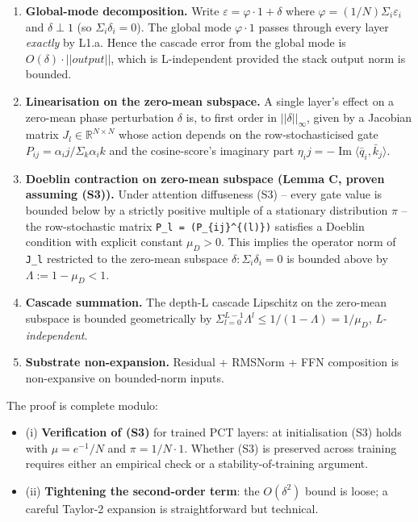 \documentclass[11pt,a4paper]{article}
\theoremstyle{plain}
\theoremstyle{definition}
\renewcommand{\Im}{\operatorname{Im}}
\begin{document}
\begin{enumerate}
  \item \textbf{Global-mode decomposition.} Write $\varepsilon  = \varphi  \cdot  1 + \delta $ where $\varphi  = (1/N) \Sigma _i \varepsilon _i$ and $\delta  \perp  1$ (so $\Sigma _i \delta _i = 0$). The global mode $\varphi  \cdot  1$ passes through every layer \emph{exactly} by L1.a. Hence the cascade error from the global mode is $O(\delta ) \cdot  ||output||$, which is L-independent provided the stack output norm is bounded.
  \item \textbf{Linearisation on the zero-mean subspace.} A single layer's effect on a zero-mean phase perturbation $\delta $ is, to first order in $||\delta ||_\infty $, given by a Jacobian matrix $J_l \in  \mathbb{R}^{N\times N}$ whose action depends on the row-stochasticised gate $P_{ij} = \alpha _ij / \Sigma _k \alpha _ik$ and the cosine-score's imaginary part $\eta _ij = -\Im \langle \bar{q}_i, \bar{k}_j\rangle $.
  \item \textbf{Doeblin contraction on zero-mean subspace (Lemma C, proven assuming (S3)).} Under attention diffuseness (S3) -- every gate value is bounded below by a strictly positive multiple of a stationary distribution $\pi $ -- the row-stochastic matrix \texttt{P\_l = (P\_\{ij\}\^{}\{(l)\})} satisfies a Doeblin condition with explicit constant $\mu _D > 0$. This implies the operator norm of \texttt{J\_l} restricted to the zero-mean subspace ${\delta  : \Sigma _i \delta _i = 0}$ is bounded above by $\Lambda  := 1 - \mu _D < 1$.
  \item \textbf{Cascade summation.} The depth-L cascade Lipschitz on the zero-mean subspace is bounded geometrically by $\Sigma _{l=0}^{L-1} \Lambda ^l \le  1/(1-\Lambda ) = 1/\mu _D$, \emph{L-independent}.
  \item \textbf{Substrate non-expansion.} Residual + RMSNorm + FFN composition is non-expansive on bounded-norm inputs.
\end{enumerate}

The proof is complete modulo:

\begin{itemize}
  \item (i) \textbf{Verification of (S3)} for trained PCT layers: at initialisation (S3) holds with $\mu  = e^{-1}/N$ and $\pi  = 1/N \cdot  1$. Whether (S3) is preserved across training requires either an empirical check or a stability-of-training argument.
  \item (ii) \textbf{Tightening the second-order term}: the $O(\delta ^2)$ bound is loose; a careful Taylor-2 expansion is straightforward but technical.
\end{itemize}
\end{document}
